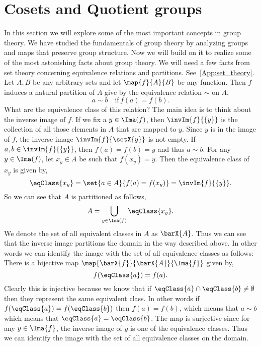 \section{Cosets and Quotient groups}
In this section we will explore some of the most important concepts in group theory. We have studied the
fundamentals of group theory by analyzing groups and maps that preserve group structure. Now we will build on
it to realize some of the most astonishing facts about group theory. We will need a few facts from set theory
concerning equivalence relations and partitions. See~\ref{App:set_theory}.
Let $A,B$ be any arbitrary sets and let $\map{f}{A}{B}$ be any function. Then $f$ induces a natural partition
of $A$ give by the equivalence relation $\sim$ on $A$,
\[a\sim b\quad \text{if}\, f(a) = f(b).\]
What are the equivalence class of this relation? The main idea is to think about the inverse image of $f$. If
we fix a $y \in \Ima(f)$, then $\invIm{f}{\lbrace y \rbrace}$ is the collection of all those elements in $A$ that
are mapped to $y$. Since $y$ is in the image of $f$, the inverse image $\invIm{f}{\setX{y}}$ is not empty. 
If $a,b \in \invIm{f}{\lbrace y \rbrace}$, then $f(a) = f(b) = y$ and thus $a \sim b$.
For any $y\in \Ima(f)$, let $x_y\in A$ be such that $f(x_y) = y$. Then the equivalence class of $x_y$ is given by,
\[\eqClass{x_y} = \set{a \in A}{f(a) = f(x_y)} = \invIm{f}{\lbrace y \rbrace}.\] 
So we can see that $A$ is partitioned as follows,
\[A = \bigcup\limits_{y\in \Ima(f)}\eqClass{x_y}.\]
We denote the set of all equivalent classes in $A$ as $\barX{A}$. 
Thus we can see that the inverse image partitions the domain in the way described above. In other words we can
identify the image with the set of all equivalence classes as follows:
There is a bijective map $\map{\barX{f}}{\barX{A}}{\Ima{f}}$ given by,
\[f(\eqClass{a}) = f(a).\]
Clearly this is injective because we know that if $\eqClass{a}\cap\eqClass{b}\neq \emptyset$ 
then they represent the same equivalent class. In other words if $f(\eqClass{a}) = f(\eqClass{b})$ then 
$f(a) = f(b)$, which means that $a\sim b$ which means that $\eqClass{a} = \eqClass{b}$. The map is surjective
since for any $y \in \Ima{f}$, the inverse image of $y$ is one of the equivalence classes. Thus we can identify the
image with the set of all equivalence classes on the domain. 

